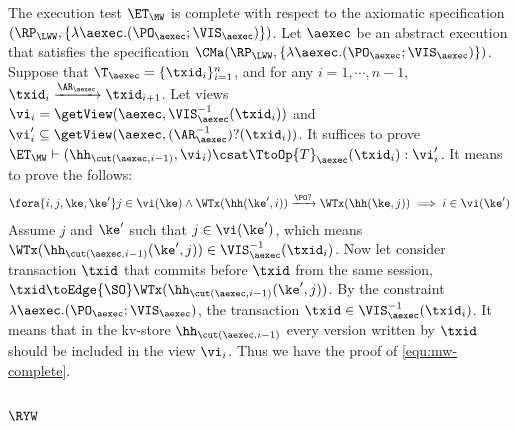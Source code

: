 The execution test $\ET_{\MW}$ is complete with respect to 
the axiomatic specification $(\RP_{\LWW}, \{\lambda \aexec.(\PO_{\aexec} ; \VIS_{\aexec})\})$. 
Let $\aexec$ be an abstract execution that satisfies the specification
$\CMa(\RP_{\LWW}, \{\lambda \aexec.(\PO_{\aexec} ; \VIS_{\aexec})\})$.
Suppose that $\T_{\aexec} = \{\txid_{i}\}_{i=1}^{n}$, and for any $i=1,\cdots, n-1$, $\txid_{i} \xrightarrow{\AR_{\aexec}} 
\txid_{i+1}$.
Let views \( \vi_{i} = \getView(\aexec, \VIS^{-1}_{\aexec}(\txid_{i}) ) \) and \( \vi'_{i} \subseteq \getView(\aexec, (\AR^{-1}_{\aexec})?(\txid_{i}) ) \).
It suffices to prove \( \ET_\MW \vdash (\hh_{\cut(\aexec, i-1)}, \vi_i ) \csat  \TtoOp{T}_{\aexec}(\txid_{i}) : \vi'_{i} \).
It means to prove the follows:
\begin{equation}
\label{equ:mw-complete}
\begin{array}{@{}l@{}}
    \fora{i,j,\ke, \ke' } j \in \vi(\ke)
    \wedge \WTx(\hh(\ke', i)) \xrightarrow{\PO?} \WTx(\hh(\ke, j)) 
    \implies i \in \vi(\ke')
\end{array}
\end{equation}
Assume \( j \) and \( \ke' \) such that \( j \in \vi(\ke')\), which means \( \WTx(\hh_{\cut(\aexec, i-1)}(\ke', j)) \in \VIS^{-1}_{\aexec}(\txid_{i}) \).
Now let consider transaction \( \txid \) that commits before \( \txid \) from the same session, \ie \( \txid \toEdge{\SO} \WTx(\hh_{\cut(\aexec, i-1)}(\ke', j)) \).
By the constraint \( \lambda \aexec.(\PO_{\aexec} ; \VIS_{\aexec}) \), the transaction \( \txid \in \VIS^{-1}_{\aexec}(\txid_{i}) \).
It means that in the kv-store \(  \hh_{\cut(\aexec, i-1)} \) every version written by \( \txid \) should be included in the view \( \vi_i \).
Thus we have the proof of \cref{equ:mw-complete}.

\subsection{ \( \RYW \) }

\label{sec:sound-complete-ryw}


